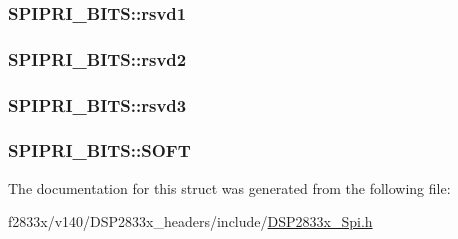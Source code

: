 \subsubsection[{rsvd1}]{ S\+P\+I\+P\+R\+I\+\_\+\+B\+I\+T\+S\+::rsvd1}\label{struct_s_p_i_p_r_i___b_i_t_s_af4950cfa9895af300bbbb3da975f6ef3}
\hypertarget{struct_s_p_i_p_r_i___b_i_t_s_a025091dda7122fc9cc9a947c51161554}{}
\subsubsection[{rsvd2}]{ S\+P\+I\+P\+R\+I\+\_\+\+B\+I\+T\+S\+::rsvd2}\label{struct_s_p_i_p_r_i___b_i_t_s_a025091dda7122fc9cc9a947c51161554}
\hypertarget{struct_s_p_i_p_r_i___b_i_t_s_a5501605b5475e776d8d31e9565377a78}{}
\subsubsection[{rsvd3}]{ S\+P\+I\+P\+R\+I\+\_\+\+B\+I\+T\+S\+::rsvd3}\label{struct_s_p_i_p_r_i___b_i_t_s_a5501605b5475e776d8d31e9565377a78}
\hypertarget{struct_s_p_i_p_r_i___b_i_t_s_a51dfb94c78516dc1b93ccc4b2cbb7bd1}{}
\subsubsection[{S\+O\+F\+T}]{ S\+P\+I\+P\+R\+I\+\_\+\+B\+I\+T\+S\+::\+S\+O\+F\+T}\label{struct_s_p_i_p_r_i___b_i_t_s_a51dfb94c78516dc1b93ccc4b2cbb7bd1}


The documentation for this struct was generated from the following file\+:\begin{DoxyCompactItemize}
\item 
f2833x/v140/\+D\+S\+P2833x\+\_\+headers/include/\hyperlink{_d_s_p2833x___spi_8h}{D\+S\+P2833x\+\_\+\+Spi.\+h}\end{DoxyCompactItemize}
